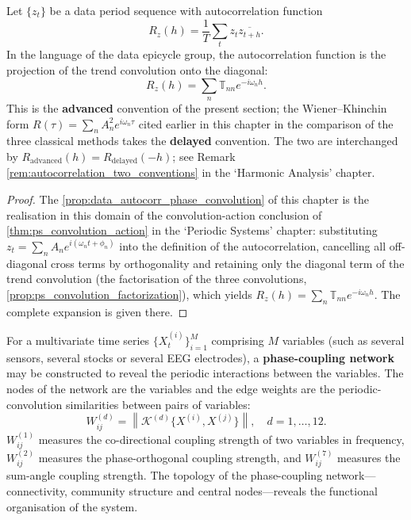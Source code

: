 \begin{proposition}\label{prop:data_autocorr_phase_convolution}
Let $\{z_t\}$ be a data period sequence with autocorrelation function
\[
R_z(h)=\frac1T\sum_t z_t\overline{z_{t+h}}.
\]
In the language of the data epicycle group, the autocorrelation function is the projection of the trend convolution onto the diagonal:
\[
R_z(h)=\sum_n\mathbb T_{nn}e^{-i\omega_n h}.
\]
This is the \textbf{advanced} convention of the present section; the Wiener--Khinchin form $R(\tau)=\sum_n A_n^2 e^{i\omega_n\tau}$ cited earlier in this chapter in the comparison of the three classical methods takes the \textbf{delayed} convention. The two are interchanged by $R_{\text{advanced}}(h)=R_{\text{delayed}}(-h)$; see Remark \ref{rem:autocorrelation_two_conventions} in the `Harmonic Analysis' chapter.
\end{proposition}

\begin{proof}
The \cref{prop:data_autocorr_phase_convolution} of this chapter is the realisation in this domain of the convolution-action conclusion of \cref{thm:ps_convolution_action} in the `Periodic Systems' chapter:
substituting $z_t=\sum_n A_n e^{i(\omega_n t+\phi_n)}$ into the definition of the autocorrelation, cancelling all off-diagonal cross terms by orthogonality and retaining only the diagonal term of the trend convolution
(the factorisation of the three convolutions, \cref{prop:ps_convolution_factorization}), which yields $R_z(h)=\sum_n\mathbb T_{nn}e^{-i\omega_n h}$.
The complete expansion is given there.
\end{proof}

\begin{definition}\label{def:phase_coupling_network}
For a multivariate time series $\{X_t^{(i)}\}_{i=1}^{M}$ comprising $M$ variables (such as several sensors, several stocks or several EEG electrodes), a \textbf{phase-coupling network} may be constructed to reveal the periodic interactions between the variables. The nodes of the network are the variables and the edge weights are the periodic-convolution similarities between pairs of variables:
\[
W_{ij}^{(d)} = \left\| \mathcal{K}^{(d)}\{X^{(i)}, X^{(j)}\} \right\|, \quad d = 1,\dots,12.
\]
$W_{ij}^{(1)}$ measures the co-directional coupling strength of two variables in frequency, $W_{ij}^{(2)}$ measures the phase-orthogonal coupling strength, and $W_{ij}^{(7)}$ measures the sum-angle coupling strength. The topology of the phase-coupling network---connectivity, community structure and central nodes---reveals the functional organisation of the system.
\end{definition}

